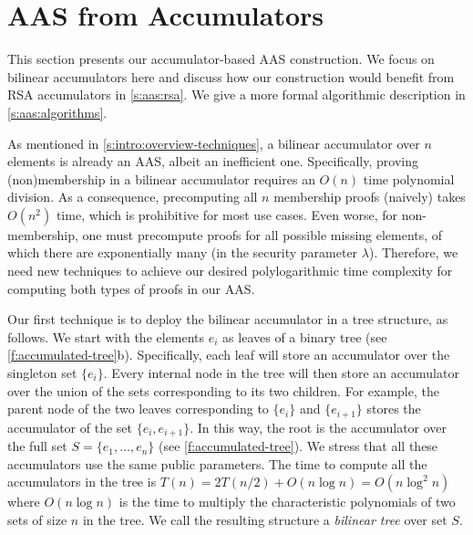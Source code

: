 \section{AAS from Accumulators}
\label{s:aas:construction}

This section presents our accumulator-based AAS construction.
We focus on bilinear accumulators here and discuss how our construction would benefit from RSA accumulators in \cref{s:aas:rsa}.
We give a more formal algorithmic description in \cref{s:aas:algorithms}.

As mentioned in \cref{s:intro:overview-techniques}, a bilinear accumulator over $n$ elements is already an AAS, albeit an inefficient one.
Specifically, proving (non)membership in a bilinear accumulator requires an $O(n)$ time polynomial division.
As a consequence, precomputing all $n$ membership proofs (naively) takes $O(n^2)$ time, which is prohibitive for most use cases.
Even worse, for non-membership, one must precompute proofs for all possible missing elements, of which there are exponentially many (in the security parameter $\lambda$).
Therefore, we need new techniques to achieve our desired polylogarithmic time complexity for computing both types of proofs in our AAS.

Our first technique is to deploy the bilinear accumulator in a tree structure, as follows.
We start with the elements $e_i$ as leaves of a binary tree (see \cref{f:accumulated-tree}b).
Specifically, each leaf will store an accumulator over the singleton set $\{e_i\}$.
Every internal node in the tree will then store an accumulator over the union of the sets corresponding to its two children.
For example, the parent node of the two leaves corresponding to $\{e_i\}$ and $\{e_{i+1}\}$ stores the accumulator of the set $\{e_i,e_{i+1}\}$.
In this way, the root is the accumulator over the full set $S = \{e_1,\dots,e_n\}$ (see \cref{f:accumulated-tree}).
We stress that all these accumulators use the same public parameters.
The time to compute all the accumulators in the tree is $T(n) = 2T(n/2) + O(n\log{n}) = O(n\log^2{n})$ where $O(n\log{n})$ is the time to multiply the characteristic polynomials of two sets of size $n$ in the tree.
We call the resulting structure a \emph{bilinear tree} over set $S$.

